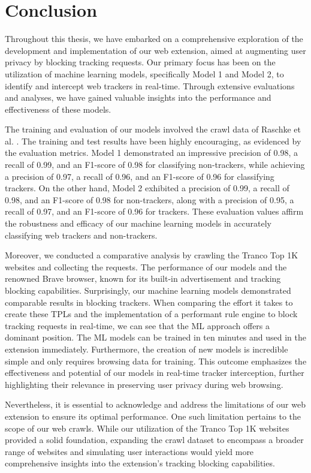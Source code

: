 \chapter{Conclusion}
\label{cha:conclusion}
Throughout this thesis, we have embarked on a comprehensive exploration of the development and implementation of our web extension,
aimed at augmenting user privacy by blocking tracking requests. Our primary focus has been on the utilization of machine learning
models, specifically Model 1 and Model 2, to identify and intercept web trackers in real-time. Through extensive evaluations
and analyses, we have gained valuable insights into the performance and effectiveness of these models.

The training and evaluation of our models involved the crawl data of Raschke et al. \cite{raschke_philip_2022_7123945}. The training and test results
have been highly encouraging, as evidenced by the
evaluation metrics. Model 1 demonstrated an impressive precision of 0.98, a recall of 0.99, and an F1-score of 0.98 for classifying
non-trackers, while achieving a precision of 0.97, a recall of 0.96, and an F1-score of 0.96 for classifying trackers. On the other
hand, Model 2 exhibited a precision of 0.99, a recall of 0.98, and an F1-score of 0.98 for non-trackers, along with a precision of 0.95,
a recall of 0.97, and an F1-score of 0.96 for trackers. These evaluation values affirm the robustness and efficacy of our machine
learning models in accurately classifying web trackers and non-trackers.

Moreover, we conducted a comparative analysis by crawling the Tranco Top 1K websites and collecting the requests. The performance of our models and 
the renowned Brave browser, known for its
built-in advertisement and tracking blocking capabilities. Surprisingly, our machine learning models demonstrated comparable
results in blocking trackers. When comparing the effort it takes to create these TPLs and the implementation of a performant 
rule engine to block tracking requests in real-time, we can see that the ML approach offers a dominant position. The ML models can be trained in ten minutes
and used in the extension immediately. Furthermore, the creation of new models is incredible simple and only requires browsing data for training.
This outcome emphasizes the effectiveness and potential of our models in real-time tracker interception,
further highlighting their relevance in preserving user privacy during web browsing.

Nevertheless, it is essential to acknowledge and address the limitations of our web extension to ensure its optimal performance.
One such limitation pertains to the scope of our web crawls. While our utilization of the Tranco Top 1K websites provided a solid
foundation, expanding the crawl dataset to encompass a broader range of websites and simulating user interactions would yield more
comprehensive insights into the extension's tracking blocking capabilities.

